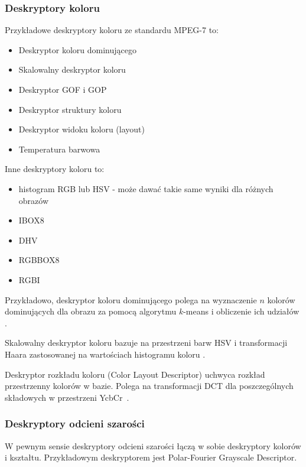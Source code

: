 \documentclass[wi]{zut}
\begin{document}
\subsubsection{Deskryptory koloru}

Przykładowe deskryptory koloru ze standardu MPEG-7 to:

\begin{itemize}
    \item Deskryptor koloru dominującego
    \item Skalowalny deskryptor koloru
    \item Deskryptor GOF i GOP
    \item Deskryptor struktury koloru
    \item Deskryptor widoku koloru (layout)
    \item Temperatura barwowa \cite{Frejlichowski2020_6}
\end{itemize}

Inne deskryptory koloru to:

\begin{itemize}
\item histogram RGB lub HSV - może dawać takie same wyniki dla różnych obrazów
\item IBOX8
\item DHV
\item RGBBOX8
\item RGBI \cite{Frejlichowski2020_6}
\end{itemize}

Przykładowo, deskryptor koloru dominującego polega na wyznaczenie $n$ kolorów dominujących dla obrazu za pomocą algorytmu $k$-means i obliczenie ich udziałów \cite{Frejlichowski2020_6}.

Skalowalny deskryptor koloru bazuje na przestrzeni barw HSV i transformacji Haara zastosowanej na wartościach histogramu koloru \cite{Frejlichowski2020_6}.

Deskryptor rozkładu koloru (Color Layout Descriptor) uchwyca rozkład przestrzenny kolorów w bazie. Polega na transformacji DCT dla poszczególnych składowych w przestrzeni YcbCr~\cite{Frejlichowski2020_6}.

\subsubsection{Deskryptory odcieni szarości}

W pewnym sensie deskryptory odcieni szarości łączą w sobie deskryptory kolorów i kształtu. Przykładowym deskryptorem jest Polar-Fourier Grayscale Descriptor.
\end{document}
